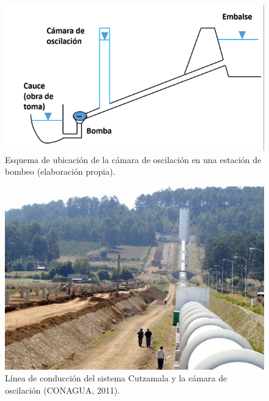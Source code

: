 \documentclass[letterpaper]{report}
\begin{document}
\newpage
\vspace*{2cm}
\begin{figure}[H]
	\centering
	\includegraphics[width=0.65\linewidth]{fig4}
	\caption{Esquema de ubicación de la cámara de oscilación en una estación de bombeo (elaboración propia).}
	\label{fig:fig4}
\end{figure}
\vspace*{2cm}
\begin{figure}[H]
	\centering
	\includegraphics[width=.7\linewidth]{fig5}
	\caption{Línea de conducción del sistema Cutzamala y la cámara de oscilación (CONAGUA, 2011).}
	\label{fig:fig5}
\end{figure}
\end{document}
